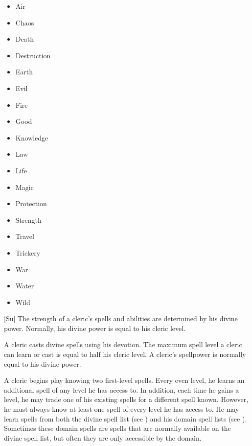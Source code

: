         \begin{itemize}
            \item{Air}
            \item{Chaos}
            \item{Death}
            \item{Destruction}
            \item{Earth}
            \item{Evil}
            \item{Fire}
            \item{Good}
            \item{Knowledge}
            \item{Law}
            \item{Life}
            \item{Magic}
            \item{Protection}
            \item{Strength}
            \item{Travel}
            \item{Trickery}
            \item{War}
            \item{Water}
            \item{Wild}
        \end{itemize}

        [Su]
        The strength of a cleric's spells and abilities are determined by his divine power.
        Normally, his divine power is equal to his cleric level.

        A cleric casts divine spells using his devotion.
        The maximum spell level a cleric can learn or cast is equal to half his cleric level.
        A cleric's spellpower is normally equal to his divine power.

        A cleric begins play knowing two first-level spells.
        Every even level, he learns an additional spell of any level he has access to.
        In addition, each time he gains a level, he may trade one of his existing spells for a different spell known.
        However, he must always know at least one spell of every level he has access to.
        He may learn spells from both the divine spell list (see ) and his domain spell lists (see ).
        Sometimes these domain spells are spells that are normally available on the divine spell list, but often they are only accessible by the domain.

